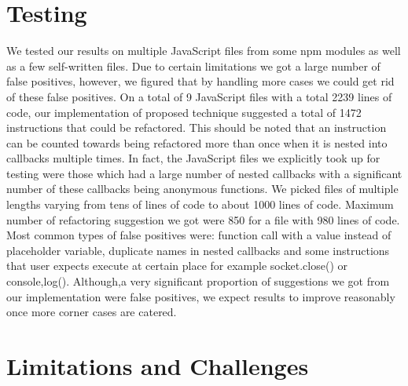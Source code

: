 \documentclass[10pt,conference]{IEEEtran}
\begin{document}
\section{Testing}
We tested our results on multiple JavaScript files from some npm modules as well as a few self-written files. Due to certain limitations we got a large number of false positives, however, we figured that by handling more cases we could get rid of these false positives. On a total of 9 JavaScript files with a total 2239 lines of code, our implementation of proposed technique suggested a total of 1472 instructions that could be refactored. This should be noted that an instruction can be counted towards being refactored more than once when it is nested into callbacks multiple times. In fact, the JavaScript files we explicitly took up for testing were those which had a large number of nested callbacks with a significant number of these callbacks being anonymous functions. We picked files of multiple lengths varying from tens of lines of code to about 1000 lines of code. Maximum number of refactoring suggestion we got were 850 for a file with 980 lines of code. Most common types of false positives were:  function call with a value instead of placeholder variable, duplicate names in nested callbacks and some instructions that user expects execute at certain place for example socket.close() or console,log(). Although,a very significant proportion of suggestions we got from our implementation were false positives, we expect results to improve reasonably once more corner cases are catered.

\section{Limitations and Challenges}
\end{document}

